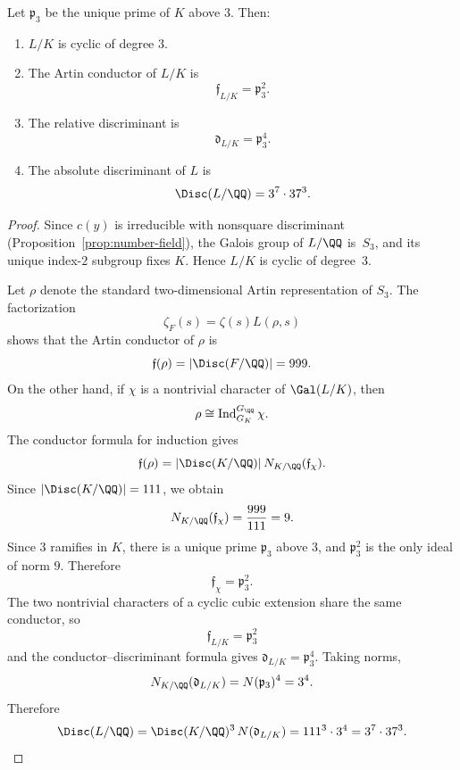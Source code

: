 \begin{theorem}\label{thm:conductor}
Let \(\mathfrak p_3\) be the unique prime of \(K\) above \(3\). Then:
\begin{enumerate}
\item[(i)] \(L/K\) is cyclic of degree \(3\).
\item[(ii)] The Artin conductor of \(L/K\) is
\[
\mathfrak f_{L/K}=\mathfrak p_3^2.
\]
\item[(iii)] The relative discriminant is
\[
\mathfrak d_{L/K}=\mathfrak p_3^4.
\]
\item[(iv)] The absolute discriminant of \(L\) is
\[
\Disc(L/\QQ)=3^7\cdot 37^3.
\]
\end{enumerate}
\end{theorem}

\begin{proof}
Since \(c(y)\) is irreducible with nonsquare discriminant (Proposition~\ref{prop:number-field}), the Galois group of \(L/\QQ\) is~\(S_3\), and its unique index-\(2\) subgroup fixes \(K\). Hence \(L/K\) is cyclic of degree~\(3\).

Let \(\rho\) denote the standard two-dimensional Artin representation of \(S_3\). The factorization
\[
\zeta_F(s)=\zeta(s)L(\rho,s)
\]
shows that the Artin conductor of \(\rho\) is
\[
\mathfrak f(\rho)=|\Disc(F/\QQ)|=999.
\]
On the other hand, if \(\chi\) is a nontrivial character of \(\Gal(L/K)\), then
\[
\rho\cong \operatorname{Ind}_{G_K}^{G_\QQ}\chi.
\]
The conductor formula for induction gives \cite[Ch.~VII]{Neukirch1999}
\[
\mathfrak f(\rho)=|\Disc(K/\QQ)|\,N_{K/\QQ}(\mathfrak f_\chi).
\]
Since \(|\Disc(K/\QQ)|=111\), we obtain
\[
N_{K/\QQ}(\mathfrak f_\chi)=\frac{999}{111}=9.
\]
Since \(3\) ramifies in \(K\), there is a unique prime \(\mathfrak p_3\) above \(3\), and \(\mathfrak p_3^2\) is the only ideal of norm \(9\). Therefore
\[
\mathfrak f_\chi=\mathfrak p_3^2.
\]
The two nontrivial characters of a cyclic cubic extension share the same conductor, so
\[
\mathfrak f_{L/K}=\mathfrak p_3^2
\]
and the conductor--discriminant formula \cite[Ch.~VII]{Neukirch1999} gives \(\mathfrak d_{L/K}=\mathfrak p_3^4\). Taking norms,
\[
N_{K/\QQ}(\mathfrak d_{L/K})=N(\mathfrak p_3)^4=3^4.
\]
Therefore
\[
\Disc(L/\QQ)=\Disc(K/\QQ)^3\,N(\mathfrak d_{L/K})
=111^3\cdot 3^4
=3^7\cdot 37^3.
\]
\end{proof}

